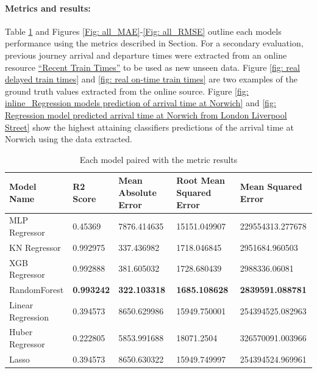 \paragraph{Metrics and results:}\label{sec: Metrics and results}
Table \ref{tab:model metrics} and Figures \ref{Fig: all_MAE}-\ref{Fig: all_RMSE} outline each models performance using the metrics described in Section. For a secondary evaluation, previous journey arrival and departure times were extracted from an online resource \href{https://www.recenttraintimes.co.uk/}{``Recent Train Times''} to be used as new unseen data. Figure \ref{fig: real delayed train times} and \ref{fig: real on-time train times} are two examples of the ground truth values extracted from the online source. Figure \ref{fig: inline_Regression models prediction of arrival time at Norwich} and \ref{fig: Regression model predicted arrival time at Norwich from London Liverpool Street} show the highest attaining classifiers predictions of the arrival time at Norwich using the data extracted.

\begin{table}[hbt!]
    \centering
    \begin{tabularx}{\textwidth}{XXXXX}
    \hline
    \textbf{Model Name} & \textbf{R2 Score} & \textbf{Mean Absolute Error} & \textbf{Root Mean Squared Error} & \textbf{Mean Squared Error} \\ 
    \hline
    MLP Regressor & 0.45369 & 7876.414635 & 15151.049907 & 229554313.277678 \\
    KN Regressor & 0.992975 & 337.436982 & 1718.046845 & 2951684.960503 \\
    XGB Regressor & 0.992888 & 381.605032 & 1728.680439 & 2988336.06081 \\
    RandomForest & \textbf{0.993242} & \textbf{322.103318} & \textbf{1685.108628} & \textbf{2839591.088781} \\
    Linear Regression & 0.394573 & 8650.629986 & 15949.750001 & 254394525.082963 \\
    Huber Regressor & 0.222805 & 5853.991688 & 18071.2504 & 326570091.003966 \\
    Lasso & 0.394573 & 8650.630322 & 15949.749997 & 254394524.969961 \\
    \hline
    \end{tabularx}
    \caption{Each model paired with the metric results}
    \label{tab:model metrics}
\end{table}

